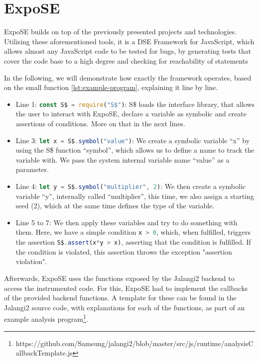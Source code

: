 \section{ExpoSE}
\label{sec:expose}
ExpoSE builds on top of the previously presented projects and technologies. Utilising these aforementioned tools, it is a DSE Framework for JavaScript, which allows almost any JavaScript code to be tested for bugs, by generating tests that cover the code base to a high degree and checking for reachability of statements\cite{loring_expose_2017}

In the following, we will demonstrate how exactly the framework operates, based on the small function \autoref{lst:example-program}, explaining it line by line.
\begin{itemize}
    \item Line 1: \lstinline[language=JavaScript]{const S$ = require("S$")}: S\$ loads the interface library, that allows the user to interact with ExpoSE, declare a variable as symbolic and create assertions of conditions. More on that in the next lines.
    \item Line 3: \lstinline[language=JavaScript]{let x = S$.symbol("value")}: We create a symbolic variable “x” by using the S\$ function “symbol”, which allows us to define a name to track the variable with. We pass the system internal variable name “value” as a parameter.  
    \item Line 4: \lstinline[language=JavaScript]{let y = S$.symbol("multiplier", 2)}: We then create a symbolic variable “y”, internally called “multiplier”, this time, we also assign a starting seed (2), which at the same time defines the type of the variable.
    \item Line 5 to 7: We then apply these variables and try to do something with them. Here, we have a simple condition \lstinline[language=JavaScript]+x > 0+, which, when fulfilled, triggers the assertion \lstinline[language=JavaScript]{S$.assert(x*y > x)}, asserting that the condition is fulfilled. If the condition is violated, this assertion throws the exception "assertion violation". 
\end{itemize}
Afterwards, ExpoSE uses the functions exposed by the Jalangi2 backend  to access the instrumented code. For this, ExpoSE had to implement the callbacks of the provided backend functions. A template for these can be found in the Jalangi2 source code, with explanations for each of the functions, as part of an example analysis program\footnote{https://github.com/Samsung/jalangi2/blob/master/src/js/runtime/analysisCallbackTemplate.js}. 

